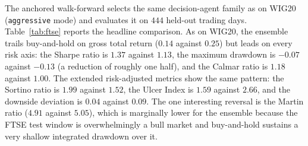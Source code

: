 \documentclass{ieeeaccess}
\newcommand{\FtseOOSDays}{\ensuremath{444}}
\newcommand{\FtseTRtest}{\ensuremath{0.14}}
\newcommand{\FtseMDD}{\ensuremath{-0.07}}
\newcommand{\FtseSharpe}{\ensuremath{1.37}}
\newcommand{\FtseCalmar}{\ensuremath{1.18}}
\newcommand{\FtseBHtest}{\ensuremath{0.25}}
\newcommand{\FtseBHmdd}{\ensuremath{-0.13}}
\newcommand{\FtseBHsharpe}{\ensuremath{1.13}}
\newcommand{\FtseBHcalmar}{\ensuremath{1.00}}
\newcommand{\FtseEnsSortino}{\ensuremath{1.99}}
\newcommand{\FtseBHSortino}{\ensuremath{1.52}}
\newcommand{\FtseEnsDownDev}{\ensuremath{0.04}}
\newcommand{\FtseBHDownDev}{\ensuremath{0.09}}
\newcommand{\FtseEnsUlcer}{\ensuremath{1.59}}
\newcommand{\FtseBHUlcer}{\ensuremath{2.66}}
\newcommand{\FtseEnsMartin}{\ensuremath{4.91}}
\newcommand{\FtseBHMartin}{\ensuremath{5.05}}
\begin{document}
The anchored walk-forward selects the same decision-agent family as on WIG20 (\texttt{aggressive} mode) and evaluates it on \FtseOOSDays{} held-out trading days. Table~\ref{tab:ftse} reports the headline comparison. As on WIG20, the ensemble trails buy-and-hold on gross total return (\FtseTRtest{} against \FtseBHtest{}) but leads on every risk axis: the Sharpe ratio is \FtseSharpe{} against \FtseBHsharpe{}, the maximum drawdown is \FtseMDD{} against \FtseBHmdd{} (a reduction of roughly one half), and the Calmar ratio is \FtseCalmar{} against \FtseBHcalmar{}. The extended risk-adjusted metrics show the same pattern: the Sortino ratio is \FtseEnsSortino{} against \FtseBHSortino{}, the Ulcer Index is \FtseEnsUlcer{} against \FtseBHUlcer{}, and the downside deviation is \FtseEnsDownDev{} against \FtseBHDownDev{}. The one interesting reversal is the Martin ratio (\FtseEnsMartin{} against \FtseBHMartin{}), which is marginally lower for the ensemble because the FTSE test window is overwhelmingly a bull market and buy-and-hold sustains a very shallow integrated drawdown over it.
\end{document}
